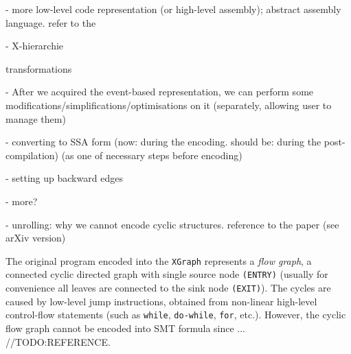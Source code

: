 - more low-level code representation (or high-level assembly); abstract assembly language. refer to the %

- X-hierarchie



transformations

- After we acquired the event-based representation, we can perform some modifications/simplifications/optimisations on it (separately, allowing user to manage them)

- converting to SSA form (now: during the encoding. should be: during the post-compilation) (as one of necessary steps before encoding)

- setting up backward edges

- more?

- unrolling: why we cannot encode cyclic structures. reference to the paper (see arXiv version)

The original program encoded into the \texttt{XGraph} represents a \textit{flow graph}, a connected cyclic directed graph with single source node \texttt{(ENTRY)} (usually for convenience all leaves are connected to the sink node \texttt{(EXIT)}). The cycles are caused by low-level jump instructions, obtained from non-linear high-level control-flow statements (such as \texttt{while}, \texttt{do-while}, \texttt{for}, etc.). However, the cyclic flow graph cannot be encoded into SMT formula since ...
//TODO:REFERENCE.%



